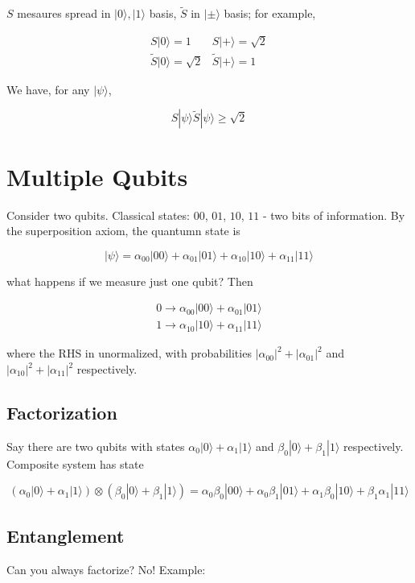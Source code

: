 \documentclass{article}
\newcommand{\<}{\langle}
\renewcommand{\>}{\rangle}
\newcommand{\q}[1] {|{#1 \rangle}}
\begin{document}
$S$ mesaures spread in $\q{0}, \q{1}$ basis, $\tilde{S}$ in $\q{\pm}$ basis; for example,

$$
\begin{array}{ll}
S \q{0} = 1 & S \q{+} = \sqrt 2 \\
\tilde{S} \q{0} = \sqrt{2} & \tilde{S} \q{+} = 1
\end{array}
$$

We have, for any $\q{\psi}$,

$$
S\q{\psi}\tilde{S}\q{\psi} \ge \sqrt{2}
$$

\section{Multiple Qubits}

Consider two qubits. Classical states: $00$, $01$, $10$, $11$ - two bits of information. By the superposition axiom, the quantumn state is

$$
\q{\psi} = \alpha_{00} \q{00} + \alpha_{01} \q{01} + \alpha_{10} \q{10} + \alpha_{11} \q{11}
$$

what happens if we measure just one qubit? Then

\begin{align}
0 \to \alpha_{00} \q{00} + \alpha_{01} \q{01} \\
1 \to \alpha_{10} \q{10} + \alpha_{11} \q{11}
\end{align}

where the RHS in unormalized, with probabilities $|\alpha_{00}|^2 + |\alpha_{01}|^2$ and $|\alpha_{10}|^2 + |\alpha_{11}|^2$ respectively.

\subsection{Factorization}

Say there are two qubits with states $\alpha_0 \q{0} + \alpha_1 \q{1}$ and $\beta_0 \q{0} + \beta_1 \q{1}$ respectively. Composite system has state

$$
(\alpha_0 \q{0} + \alpha_1 \q{1}) \otimes (\beta_0 \q{0} + \beta_1 \q{1}) = \alpha_0 \beta_0 \q{00} + \alpha_0 \beta_1 \q{01} + \alpha_1 \beta_0 \q{10} + \beta_1 \alpha_1 \q{11}
$$

\subsection{Entanglement}

Can you always factorize? No! Example:
\end{document}

